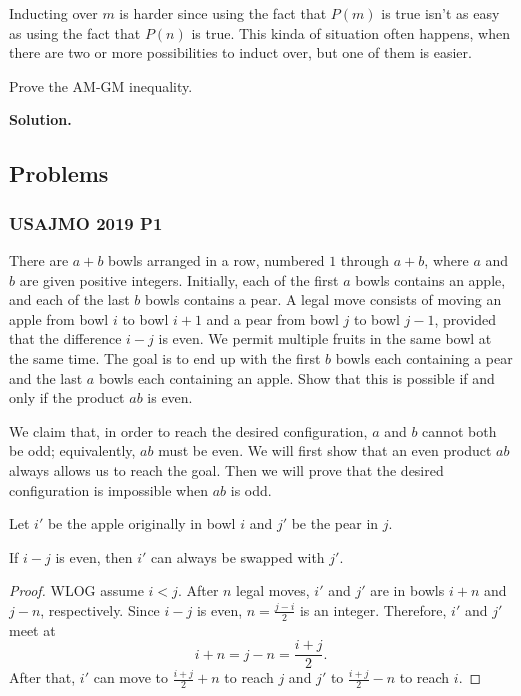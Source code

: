 \begin{insight}
	Inducting over $m$ is harder since using the fact that $P(m)$ is true isn't as easy as using the fact that $P(n)$ is true.
	This kinda of situation often happens, when there are two or more possibilities to induct over, but one of them is easier.
\end{insight}

\begin{example}{}{}
	Prove the AM-GM inequality.
\end{example}
\textcolor{color2}{\textbf{Solution. }}

\clearpage

\subsection{\textsf{Problems}}

\subsubsection{USAJMO 2019 P1}

\begin{problem}
There are $a+b$ bowls arranged in a row, numbered $1$ through $a+b$, where $a$
and $b$ are given positive integers. Initially, each of the first $a$
bowls contains an apple, and each of the last $b$ bowls contains a
pear. A legal move consists of moving an apple from bowl $i$ to bowl $i+1$
and a pear from bowl $j$ to bowl $j-1$, provided that the difference $i-j$ is
even. We permit multiple fruits in the same bowl at the same time. The goal is
to end up with the first $b$ bowls each containing a pear and the last $a$
bowls each containing an apple. Show that this is possible if and only if the
product $ab$ is even.
\end{problem}

We claim that, in order to reach the desired configuration, $a$ and $b$ cannot
both be odd; equivalently, $ab$ must be even. We will first show that an even
product $ab$ always allows us to reach the goal. Then we will prove that the
desired configuration is impossible when $ab$ is odd.

Let $i'$ be the apple originally in bowl $i$ and $j'$ be the pear
in $j$.

\begin{claim}
	If $i-j$ is even, then $i'$ can always be swapped with $j'$.
\end{claim}

\begin{proof}
	WLOG assume $i<j$. After $n$ legal moves, $i'$ and $j'$ are in bowls $i+n$ and
	$j-n$, respectively. Since $i-j$ is even, $n=\frac{j-i}{2}$ is an integer.
	Therefore, $i'$ and $j'$ meet at
	\[
		i+n=j-n=\frac{i+j}{2}.
	\]
	After that, $i'$ can move to $\frac{i+j}{2}+n$ to reach $j$ and $j'$ to
	$\frac{i+j}{2}-n$ to reach $i$.
\end{proof}

